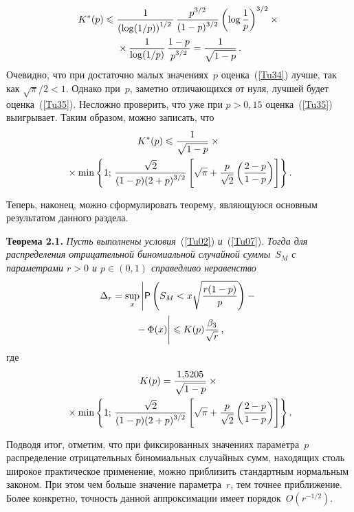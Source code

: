 \begin{multicols}{2}
\begin{multline}
K^*(p) \leqslant \displaystyle\frac{\displaystyle 1\mathstrut}{\displaystyle \left(\log({1}/{p})\right)^{1/2}\mathstrut}
\, \displaystyle\frac{\displaystyle p^{3/2}\mathstrut}{\displaystyle (1-p)^{3/2}\mathstrut}\left(\log\displaystyle\frac{\displaystyle 1\mathstrut}{\displaystyle p\mathstrut}\right)^{3/2}\times{}\\
{}\times
\displaystyle\frac{\displaystyle 1\mathstrut}{\displaystyle \log({1}/{p})\mathstrut} \, \displaystyle\frac{\displaystyle 1-p\mathstrut}{\displaystyle p^{3/2}\mathstrut} =
\displaystyle\frac{\displaystyle 1\mathstrut}{\displaystyle \sqrt{1-p}\mathstrut}\,.
\label{Tu35}
\end{multline}
Очевидно, что при достаточно малых значениях~$p$ оценка~(\ref{Tu34}) лучше, 
так как $\sqrt{\pi}/2 < 1$. Однако при~$p$,
заметно отличающихся от нуля, лучшей будет оценка~(\ref{Tu35}).
Несложно проверить, что уже при $p > 0{,}15$ оценка~(\ref{Tu35})
выигрывает. Таким образом, можно записать, что
\begin{multline*}
K^*(p) \leqslant
\displaystyle\frac{\displaystyle 1\mathstrut}{\displaystyle \sqrt{1-p}\mathstrut}\times{}\\
{}\times\min\left\{1;\,\displaystyle\frac{\displaystyle \sqrt{2}\mathstrut}{\displaystyle (1-p)(2+p)^{3/2}\mathstrut}
 \left[\sqrt{\pi}+\displaystyle\frac{\displaystyle p\mathstrut}{\displaystyle \sqrt{2}\mathstrut}\left(\displaystyle\frac{\displaystyle 2-p\mathstrut}{\displaystyle 1-p\mathstrut}\right)\right]\right\}.
\end{multline*}

Теперь, наконец, можно сформулировать теорему, являющуюся основным
результатом данного раздела.

\medskip

\noindent
\textbf{Теорема 2.1.} \textit{Пусть выполнены условия}~(\ref{Tu02}) \textit{и}~(\ref{Tu07}).
\textit{Тогда для распределения отрицательной биномиальной случайной суммы~$S_M$ с параметрами $r>0$ 
и $p \in (0,1)$ справедливо неравенство}
\begin{multline*}
\Delta_r=\sup_x
\left|\p\left(S_M<x\sqrt{\fr{r(1-p)}{p}}\right)-{}\right.\\
\left.{}-\Phi(x)  \vphantom{\sqrt{\fr{r(1-p)}{p}}}
\right|
\leqslant
K(p)\fr{\beta_3}{\sqrt{r}}\,,
\end{multline*}
где
\begin{multline*}
K(p)=\displaystyle\frac{\displaystyle 1{,}5205\mathstrut}{\displaystyle \sqrt{1-p}\mathstrut}\times{}\\
{}\times\min\left\{1;\,\displaystyle\frac{\displaystyle \sqrt{2}\mathstrut}{\displaystyle (1-p)(2+p)^{3/2}\mathstrut}
\left[\sqrt{\pi}+\displaystyle\frac{\displaystyle p\mathstrut}{\displaystyle \sqrt{2}\mathstrut}\left(\displaystyle\frac{\displaystyle 2-p\mathstrut}{\displaystyle 1-p\mathstrut}\right)\right]\right\}.
\end{multline*}



Подводя итог, отметим, что при фиксированных значениях параметра~$p$ 
распределение отрицательных биномиальных случайных сумм,
находящих столь широкое практическое применение, можно приблизить
стандартным нормальным законом. При этом чем больше значение
параметра~$r$, тем точнее приближение. Более конкретно, точность
данной аппроксимации имеет порядок~$O\left(r^{-1/2}\right)$.



\end{multicols}
